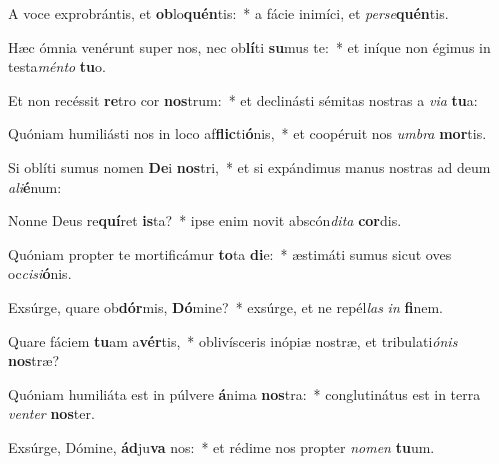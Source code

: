 \item A voce exprobrántis, et \textbf{ob}lo\textbf{quén}tis:~* a fácie inimíci, et \textit{per}\textit{se}\textbf{quén}tis.
\item Hæc ómnia venérunt super nos, nec ob\textbf{lí}ti \textbf{su}mus te:~* et iníque non égimus in testa\textit{mén}\textit{to} \textbf{tu}o.
\item Et non recéssit \textbf{re}tro cor \textbf{nos}trum:~* et declinásti sémitas nostras a \textit{vi}\textit{a} \textbf{tu}a:
\item Quóniam humiliásti nos in loco af\textbf{flic}ti\textbf{ó}nis,~* et coopéruit nos \textit{um}\textit{bra} \textbf{mor}tis.
\item Si oblíti sumus nomen \textbf{De}i \textbf{nos}tri,~* et si expándimus manus nostras ad deum \textit{a}\textit{li}\textbf{é}num:
\item Nonne Deus re\textbf{quí}ret \textbf{is}ta?~* ipse enim novit abscón\textit{di}\textit{ta} \textbf{cor}dis.
\item Quóniam propter te mortificámur \textbf{to}ta \textbf{di}e:~* æstimáti sumus sicut oves oc\textit{ci}\textit{si}\textbf{ó}nis.
\item Exsúrge, quare ob\textbf{dór}mis, \textbf{Dó}mine?~* exsúrge, et ne repél\textit{las} \textit{in} \textbf{fi}nem.
\item Quare fáciem \textbf{tu}am a\textbf{vér}tis,~* oblivísceris inópiæ nostræ, et tribulati\textit{ó}\textit{nis} \textbf{nos}træ?
\item Quóniam humiliáta est in púlvere \textbf{á}nima \textbf{nos}tra:~* conglutinátus est in terra \textit{ven}\textit{ter} \textbf{nos}ter.
\item Exsúrge, Dómine, \textbf{ád}ju\textbf{va} nos:~* et rédime nos propter \textit{no}\textit{men} \textbf{tu}um.
